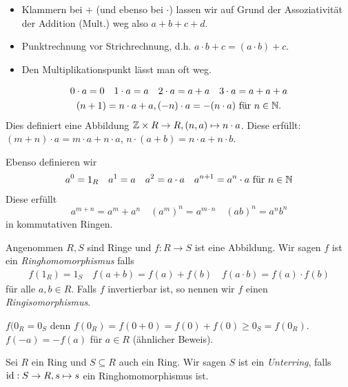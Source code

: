\begin{convention}
	\begin{itemize}
		\item Klammern bei $+$ (und ebenso bei $\cdot$) lassen wir auf Grund der Assoziativität der Addition (Mult.) weg also $a+b+c+d$.
		\item Punktrechnung vor Strichrechnung, d.h. $a\cdot b +c = (a\cdot b) + c$.
		\item Den Multiplikationspunkt lässt man oft weg.
	\end{itemize}
\end{convention}

\begin{notation}
	\begin{gather*}
		0\cdot a = 0 \quad 1\cdot a = a \quad 2\cdot a = a+a \quad 3\cdot a = a+a+a\\
		(n+1) = n\cdot a + a, (-n) \cdot a = -(n\cdot a) \text{ für } n \in \mathbb{N}
	.\end{gather*}
	Dies definiert eine Abbildung $\mathbb{Z} \times R \to R, (n,a) \mapsto n\cdot a$.
	Diese erfüllt:  $(m+n) \cdot a = m\cdot a + n \cdot a$, $n \cdot (a+b) = n\cdot a + n \cdot b$.

	Ebenso definieren wir
	\begin{gather*}
		a^{0} = 1_{R} \quad a^{1} = a \quad a^2 = a\cdot a \quad a^{n+1} = a^{n} \cdot a \text{ für } n \in \mathbb{N}
	\end{gather*}
	Diese erfüllt
	\[
		a^{m+n} = a^{m} + a^{n} \quad (a^{m})^{n} = a^{m\cdot n} \quad (ab)^{n} = a^{n} b^{n}
	\] 
	in kommutativen Ringen.
\end{notation}

\begin{definition}
	Angenommen $R,S$ sind Ringe und $f: R \to S$ ist eine Abbildung.
	Wir sagen $f$ ist ein \emph{Ringhomomorphismus} falls
	\begin{gather*}
		f(1_{R}) = 1_{S} \quad f(a+b) = f(a) + f(b) \quad f(a\cdot b) = f(a) \cdot f(b)
	\end{gather*}
	für alle $a,b \in R$.
	Falls $f$ invertierbar ist, so nennen wir $f$ einen \emph{Ringisomorphismus}.
\end{definition}

\begin{remark}
	$f(0_{R} = 0_{S}$ denn $f(0_{R}) = f(0+0) = f(0) + f(0) \geq 0_{S} = f(0_{R})$.\\
	$f(-a) = -f(a)$ für $a \in R$ (ähnlicher Beweis).
\end{remark}

\begin{definition}
	Sei $R$ ein Ring und $S \subseteq R$ auch ein Ring. 
	Wir sagen $S$ ist ein \emph{Unterring}, falls $\operatorname{id}: S \to R, s \mapsto s$ ein Ringhomomorphismus ist.
\end{definition}




